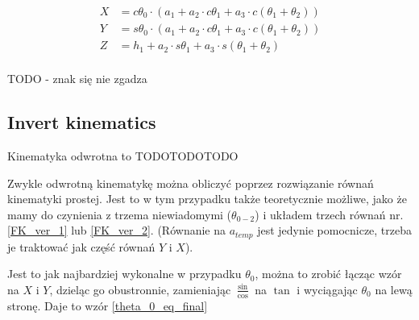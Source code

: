 \begin{equation} \label{FK_ver_2}
\begin{split}
X &= c\theta_0 \cdot \left( a_1 + a_2 \cdot c\theta_1 + a_3  \cdot c\left( \theta_1 + \theta_2 \right) \right)\\
Y &= s\theta_0 \cdot \left( a_1 + a_2 \cdot c\theta_1 + a_3  \cdot c\left( \theta_1 + \theta_2 \right) \right)\\
Z &= h_1 + a_2 \cdot s\theta_1 + a_3 \cdot s\left( \theta_1 + \theta_2 \right)\\
\end{split}
\end{equation}

TODO - znak się nie zgadza


\subsection{Invert kinematics}
Kinematyka odwrotna to TODOTODOTODO

Zwykle odwrotną kinematykę można obliczyć poprzez rozwiązanie równań kinematyki prostej. Jest to w tym przypadku także teoretycznie możliwe, jako że mamy do czynienia z trzema niewiadomymi ($\theta_{0-2}$) i układem trzech równań nr. \ref{FK_ver_1} lub \ref{FK_ver_2}. (Równanie na $a_{temp}$ jest jedynie pomocnicze, trzeba je traktować jak część równań $Y$ i $X$).

Jest to jak najbardziej wykonalne w przypadku $\theta_0$, można to zrobić łącząc wzór na $X$ i $Y$, dzieląc go obustronnie, zamieniając $\frac{\sin}{\cos}$ na $\tan$ i wyciągając $\theta_0$ na lewą stronę. Daje to wzór \ref{theta_0_eq_final}




